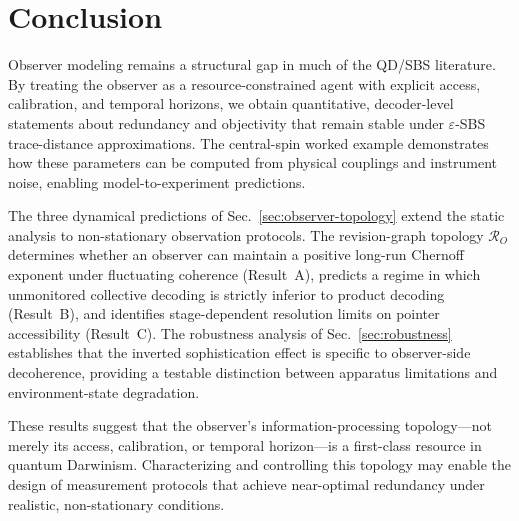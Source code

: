 \documentclass[11pt]{article}
\newcommand{\cR}{\mathcal{R}}
\newcommand{\1}{\mathbf{1}}
\theoremstyle{definition}
\theoremstyle{plain}
\begin{document}
\section{Conclusion}

Observer modeling remains a structural gap in much of the QD/SBS literature.
By treating the observer as a resource-constrained agent with explicit access, calibration, and temporal horizons, we obtain quantitative, decoder-level statements about redundancy and objectivity that remain stable under $\varepsilon$-SBS trace-distance approximations.
The central-spin worked example demonstrates how these parameters can be computed from physical couplings and instrument noise, enabling model-to-experiment predictions.

The three dynamical predictions of Sec.~\ref{sec:observer-topology} extend the static analysis to non-stationary observation protocols.  The revision-graph topology $\cR_O$ determines whether an observer can maintain a positive long-run Chernoff exponent under fluctuating coherence (Result~A), predicts a regime in which unmonitored collective decoding is strictly inferior to product decoding (Result~B), and identifies stage-dependent resolution limits on pointer accessibility (Result~C).  The robustness analysis of Sec.~\ref{sec:robustness} establishes that the inverted sophistication effect is specific to observer-side decoherence, providing a testable distinction between apparatus limitations and environment-state degradation.

These results suggest that the observer's information-processing topology---not merely its access, calibration, or temporal horizon---is a first-class resource in quantum Darwinism.  Characterizing and controlling this topology may enable the design of measurement protocols that achieve near-optimal redundancy under realistic, non-stationary conditions.



\end{document}
